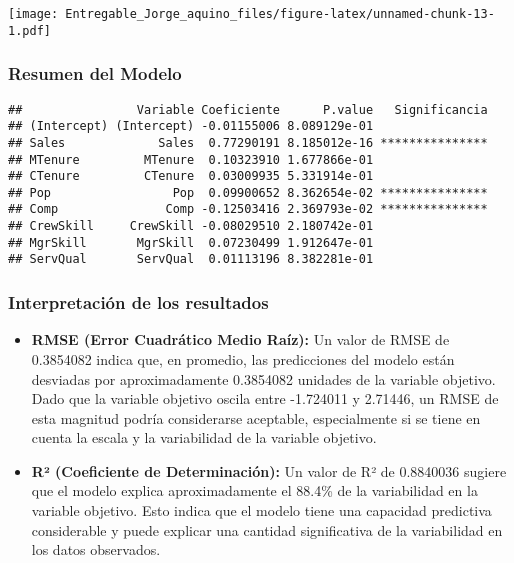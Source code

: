 \documentclass[
]{article}
\begin{document}
\texttt{[image: Entregable\_Jorge\_aquino\_files/figure-latex/unnamed-chunk-13-1.pdf]}

\hypertarget{resumen-del-modelo}{%
\subsubsection{Resumen del Modelo}\label{resumen-del-modelo}}

\begin{verbatim}
##                Variable Coeficiente      P.value   Significancia
## (Intercept) (Intercept) -0.01155006 8.089129e-01                
## Sales             Sales  0.77290191 8.185012e-16 ***************
## MTenure         MTenure  0.10323910 1.677866e-01                
## CTenure         CTenure  0.03009935 5.331914e-01                
## Pop                 Pop  0.09900652 8.362654e-02 ***************
## Comp               Comp -0.12503416 2.369793e-02 ***************
## CrewSkill     CrewSkill -0.08029510 2.180742e-01                
## MgrSkill       MgrSkill  0.07230499 1.912647e-01                
## ServQual       ServQual  0.01113196 8.382281e-01
\end{verbatim}

\hypertarget{interpretaciuxf3n-de-los-resultados}{%
\subsubsection{Interpretación de los
resultados}\label{interpretaciuxf3n-de-los-resultados}}

\begin{itemize}
\item
  \textbf{RMSE (Error Cuadrático Medio Raíz):} Un valor de RMSE de
  0.3854082 indica que, en promedio, las predicciones del modelo están
  desviadas por aproximadamente 0.3854082 unidades de la variable
  objetivo. Dado que la variable objetivo oscila entre -1.724011 y
  2.71446, un RMSE de esta magnitud podría considerarse aceptable,
  especialmente si se tiene en cuenta la escala y la variabilidad de la
  variable objetivo.
\item
  \textbf{R² (Coeficiente de Determinación):} Un valor de R² de
  0.8840036 sugiere que el modelo explica aproximadamente el 88.4\% de
  la variabilidad en la variable objetivo. Esto indica que el modelo
  tiene una capacidad predictiva considerable y puede explicar una
  cantidad significativa de la variabilidad en los datos observados.
\end{itemize}
\end{document}
